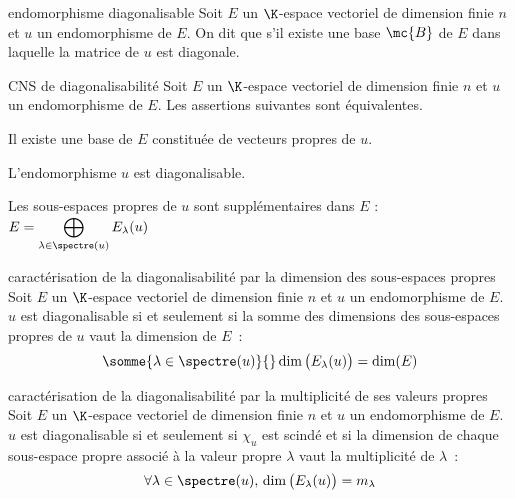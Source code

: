 

\begin{adjustwidth}{-3cm}{-3cm}


\begin{definition}{7.1}{endomorphisme diagonalisable}
    Soit $E$ un $\K$-espace vectoriel de dimension finie $n$ et $u$ un endomorphisme de $E$. On dit que  s'il existe une base $\mc{B}$ de $E$ dans laquelle la matrice de $u$ est diagonale.

\end{definition}

\begin{proposition}{7.2}{CNS de diagonalisabilité}
    Soit $E$ un $\K$-espace vectoriel de dimension finie $n$ et $u$ un endomorphisme de $E$. Les assertions suivantes sont équivalentes.
    \begin{enumeratebf}
        \item Il existe une base de $E$ constituée de vecteurs propres de $u$.
        \item L'endomorphisme $u$ est diagonalisable.
        \item Les sous-espaces propres de $u$ sont supplémentaires dans $E$ : $\displaystyle E = \bigoplus_{\lambda \in \spectre(u)}E_\lambda (u)$
    \end{enumeratebf}
\end{proposition}

\begin{theoreme}{7.6}{caractérisation de la diagonalisabilité par la dimension des sous-espaces propres}
    Soit $E$ un $\K$-espace vectoriel de dimension finie $n$ et $u$ un endomorphisme de $E$. $u$ est diagonalisable si et seulement si la somme des dimensions des sous-espaces propres de $u$ vaut la dimension de $E$~:
    $$\somme{\lambda \in \spectre(u) }{}\dim\big(E_\lambda(u)\big) = \dim(E)$$ 
\end{theoreme}

\begin{theoreme}{7.7}{caractérisation de la diagonalisabilité par la multiplicité de ses valeurs propres}
    Soit $E$ un $\K$-espace vectoriel de dimension finie $n$ et $u$ un endomorphisme de $E$. $u$ est diagonalisable si et seulement si $\chi_u$ est scindé et si la dimension de chaque sous-espace propre associé à la valeur propre $\lambda$ vaut la multiplicité de $\lambda$~:
    $$\forall \lambda \in \spectre(u),\, \dim\big(E_\lambda(u)\big) = m_\lambda$$
\end{theoreme}


\end{adjustwidth}
